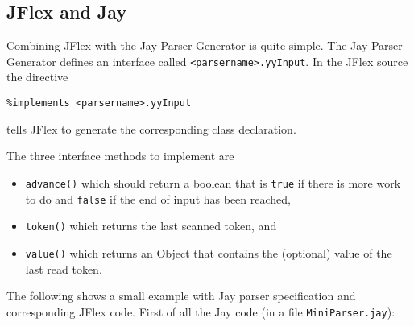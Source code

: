 \subsection{JFlex and Jay}

Combining JFlex with the Jay Parser Generator \cite{Jay} is quite simple.
The Jay Parser Generator defines an interface called \verb!<parsername>.yyInput!.
In the JFlex source the directive
\begin{verbatim}
%implements <parsername>.yyInput
\end{verbatim}
tells JFlex to generate the corresponding class declaration.

The three interface methods to implement are
\begin{itemize}
\item \verb!advance()! which should return a boolean that is \verb!true! if there is more work to do
and \verb!false! if the end of input has been reached,
\item \verb!token()! which returns the last scanned token, and
\item \verb!value()! which returns an Object that contains the (optional) value of the last read token.
\end{itemize}

The following shows a small example with Jay parser specification and corresponding JFlex code.
First of all the Jay code (in a file \texttt{MiniParser.jay}):

